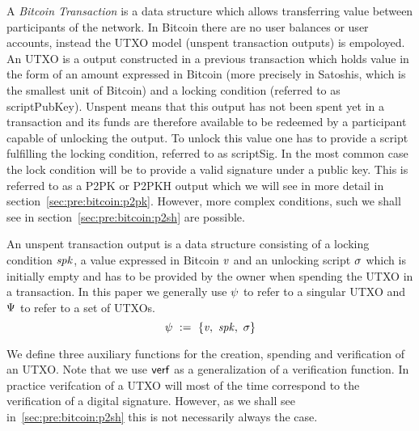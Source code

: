 A \emph{Bitcoin Transaction} is a data structure which allows transferring value between participants of the network.
In Bitcoin there are no user balances or user accounts, instead the UTXO model (unspent transaction outputs) is empoloyed.
An UTXO is a output constructed in a previous transaction which holds value in the form of an amount expressed in
Bitcoin (more precisely in Satoshis, which is the smallest unit of Bitcoin) and a locking condition (referred to as
scriptPubKey).
Unspent means that this output has not been spent yet in a transaction and its funds are therefore available to be redeemed by a participant capable of unlocking the output.
To unlock this value one has to provide a script fulfilling the locking condition, referred to as scriptSig.
In the most common case the lock condition will be to provide a valid signature under a public key.
This is referred to as a P2PK or P2PKH output which we will see in more detail in section~\ref{sec:pre:bitcoin:p2pk}.
However, more complex conditions, such we shall see in section~\ref{sec:pre:bitcoin:p2sh} are possible.

\begin{definition} An unspent transaction output is a data structure
consisting of a locking condition $\mathit{spk}$, a value expressed in Bitcoin $\mathit{v}$ and an unlocking script $\mathit{\sigma}$ which is
initially empty and has to be provided by the owner when spending the UTXO in a transaction. In this paper we
generally use $\psi$ to refer to a singular UTXO and $\Psi$ to refer to a set of UTXOs.
    \[ \psi ~:=~ \{ \mathit{v} ,~ \mathit{spk} ,~ \mathit{\sigma} \} \]
\end{definition}

We define three auxiliary functions for the creation, spending and verification of an UTXO.
Note that we use $\mathsf{verf}$ as a generalization of a verification function.
In practice verifcation of a UTXO will most of the time correspond to the verification of a digital signature.
However, as we shall see in~\ref{sec:pre:bitcoin:p2sh} this is not necessarily always the case.

